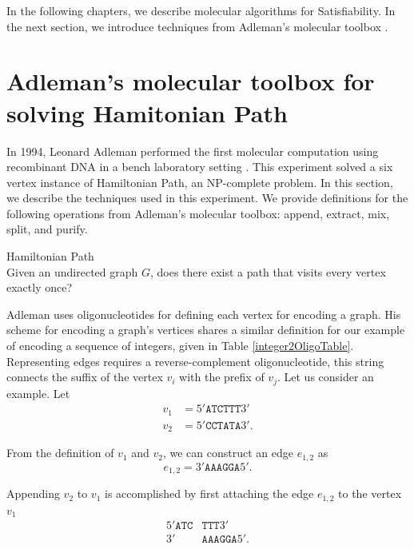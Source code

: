 In the following chapters, we describe molecular algorithms for {\sc Satisfiability}.  In the next section, we introduce techniques from Adleman's molecular toolbox \cite{Adleman:1994:MCS:189441.189442}.

\section{Adleman's molecular toolbox for solving {\sc Hamitonian Path}}
	
In 1994, Leonard Adleman performed the first molecular computation using recombinant DNA in a bench laboratory setting \cite{Adleman:1994:MCS:189441.189442}.  This experiment solved a six vertex instance of {\sc Hamiltonian Path}, an \textsf{NP-complete} problem.  In this section, we describe the techniques used in this experiment. We provide definitions for the following operations from Adleman's molecular toolbox: append, extract, mix, split, and purify.

\begin{definition}
{\sc Hamiltonian Path} \\
Given an undirected graph $G$, does there exist a path that visits every vertex exactly once?

\end{definition}

%


Adleman uses oligonucleotides for defining each vertex for encoding a graph.  His scheme for encoding a graph's vertices shares a similar definition for our example of encoding a sequence of integers, given in Table \ref{integer2OligoTable}.  Representing edges requires a reverse-complement oligonucleotide, this string connects the suffix of the vertex $v_i$ with the prefix of $v_j$.  Let us consider an example.  Let
\begin{align*}
 v_1 &= 5'\texttt{ATCTTT}3' \\
 v_2 &= 5'\texttt{CCTATA}3'.
\end{align*}

\noindent From the definition of $v_1$ and $v_2$, we can construct an edge $e_{1,2}$ as
\[
e_{1,2} = 3'\texttt{AAAGGA}5'.
\]

\noindent Appending $v_2$ to $v_1$ is accomplished by first attaching the edge $e_{1,2}$ to the vertex $v_1$
\begin{align*}
 5'\texttt{ATC}&\texttt{TTT}3' \\
  3'&\texttt{AAAGGA}5'.
\end{align*}

